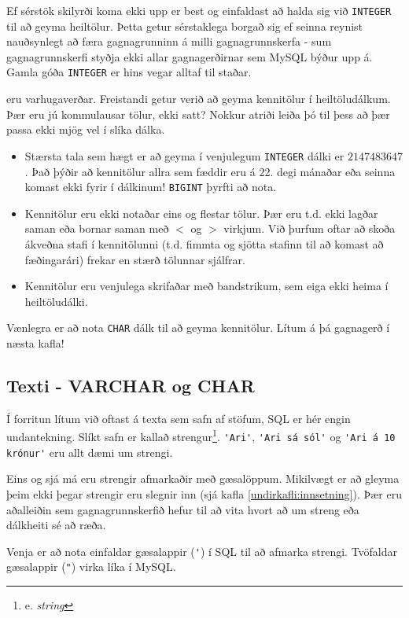 Ef sérstök skilyrði koma ekki upp er best og einfaldast að halda sig við \verb|INTEGER| til að geyma heiltölur. Þetta getur sérstaklega borgað sig ef seinna reynist nauðsynlegt að færa gagnagrunninn á milli gagnagrunnskerfa - sum gagnagrunnskerfi styðja ekki allar gagnagerðirnar sem MySQL býður upp á. Gamla góða \verb|INTEGER| er hins vegar alltaf til staðar.

 eru varhugaverðar. Freistandi getur verið að geyma kennitölur í heiltöludálkum. Þær eru jú kommulausar tölur, ekki satt? Nokkur atriði leiða þó til þess að þær passa ekki mjög vel í slíka dálka.

\begin{itemize}
 \item Stærsta tala sem hægt er að geyma í venjulegum \verb|INTEGER| dálki er $2147483647$. Það þýðir að kennitölur allra sem fæddir eru á 22. degi mánaðar eða seinna komast ekki fyrir í dálkinum! \verb|BIGINT| þyrfti að nota.
 \item Kennitölur eru ekki notaðar eins og flestar tölur. Þær eru t.d. ekki lagðar saman eða bornar saman með $<$ og $>$ virkjum. Við þurfum oftar að skoða ákveðna stafi í kennitölunni (t.d. fimmta og sjötta stafinn til að komast að fæðingarári) frekar en stærð tölunnar sjálfrar.
 \item Kennitölur eru venjulega skrifaðar með bandstrikum, sem eiga ekki heima í heiltöludálki.
\end{itemize}
Vænlegra er að nota \verb|CHAR| dálk til að geyma kennitölur. Lítum á þá gagnagerð í næsta kafla!

\subsection{Texti - VARCHAR og CHAR}
\label{undirkafli:texti}
Í forritun lítum við oftast á texta sem safn af stöfum, SQL er hér engin undantekning. Slíkt safn er kallað strengur\footnote{e. \emph{string}}. \verb|'Ari'|, \verb|'Ari sá sól'| og \verb|'Ari á 10 krónur'| eru allt dæmi um strengi. 

Eins og sjá má eru strengir afmarkaðir með gæsalöppum. Mikilvægt er að gleyma þeim ekki þegar strengir eru slegnir inn (sjá kafla \ref{undirkafli:innsetning}). Þær eru aðalleiðin sem gagnagrunnskerfið hefur til að vita hvort að um streng eða dálkheiti sé að ræða. 

Venja er að nota einfaldar gæsalappir (\verb|'|) í SQL til að afmarka strengi. Tvöfaldar gæsalappir (\verb|"|) virka líka í MySQL.

